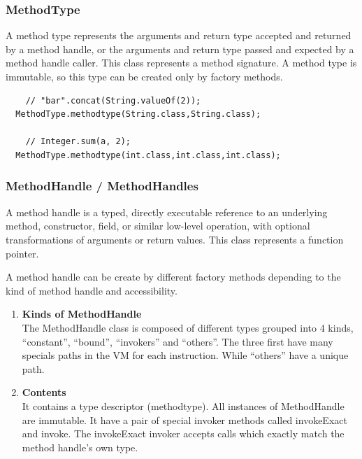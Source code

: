 \documentclass{sigplanconf}
\def \DALVIK{\mbox{Dalvik}\xspace}
\def \VM{\ac{VM}\xspace}
\begin{document}
      \subsubsection{MethodType}
        A method type represents the arguments and return type accepted and returned by a method handle,
        or the arguments and return type passed and expected by a method handle caller.
        This class represents a method signature.
        A method type is immutable, so this type can be created only by factory methods.
        

        {\tiny
          \begin{verbatim}
    // "bar".concat(String.valueOf(2));
  MethodType.methodtype(String.class,String.class);

    // Integer.sum(a, 2);
  MethodType.methodtype(int.class,int.class,int.class);
          \end{verbatim}
        }

      \subsubsection{MethodHandle / MethodHandles}
        A method handle is a typed, directly executable reference to
        an underlying method, constructor, field, or similar low-level operation,
        with optional transformations of arguments or return values.
        This class represents a function pointer.
        
        A method handle can be create by different factory methods depending to the kind of method handle and accessibility.
        

        \begin{enumerate}
          \item \textbf{Kinds of MethodHandle}\\
            The MethodHandle class is composed of different types grouped into 4 kinds,
            ``constant'', ``bound'', ``invokers'' and ``others''.
            The three first have many specials paths in the \VM for each instruction.
            While ``others'' have a unique path.
          \item \textbf{Contents}\\
            It contains a type descriptor (methodtype).
            All instances of MethodHandle are immutable.
            It have a pair of special invoker methods called invokeExact and invoke.
            The invokeExact invoker accepts calls which exactly match the method handle's own type.
        \end{enumerate}
\end{document}
